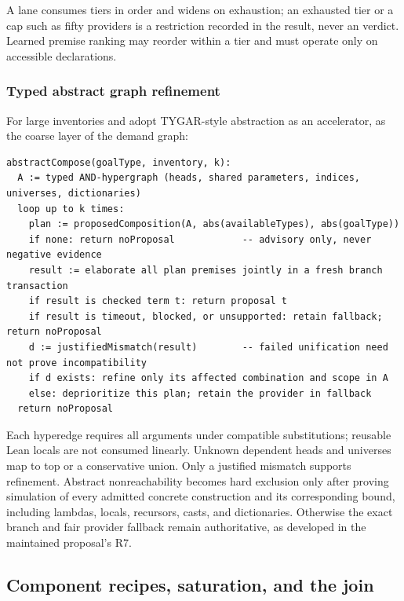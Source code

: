 A lane consumes tiers in order and widens on exhaustion; an exhausted tier or a cap such as fifty providers is a restriction recorded in the result, never an  verdict. Learned premise ranking may reorder within a tier and must operate only on accessible declarations.

\subsubsection{Typed abstract graph refinement}

For large inventories  and  adopt TYGAR-style abstraction as an accelerator,  as the coarse layer of the demand graph:

\begin{lstlisting}
abstractCompose(goalType, inventory, k):
  A := typed AND-hypergraph (heads, shared parameters, indices, universes, dictionaries)
  loop up to k times:
    plan := proposedComposition(A, abs(availableTypes), abs(goalType))
    if none: return noProposal            -- advisory only, never negative evidence
    result := elaborate all plan premises jointly in a fresh branch transaction
    if result is checked term t: return proposal t
    if result is timeout, blocked, or unsupported: retain fallback; return noProposal
    d := justifiedMismatch(result)        -- failed unification need not prove incompatibility
    if d exists: refine only its affected combination and scope in A
    else: deprioritize this plan; retain the provider in fallback
  return noProposal
\end{lstlisting}

Each hyperedge requires all arguments under compatible substitutions; reusable Lean locals are not consumed linearly. Unknown dependent heads and universes map to top or a conservative union. Only a justified mismatch supports refinement. Abstract nonreachability becomes hard exclusion only after proving simulation of every admitted concrete construction and its corresponding bound, including lambdas, locals, recursors, casts, and dictionaries. Otherwise the exact branch and fair provider fallback remain authoritative, as developed in the maintained proposal's R7.

\subsection{Component recipes, saturation, and the join}\label{alg:recipes}

